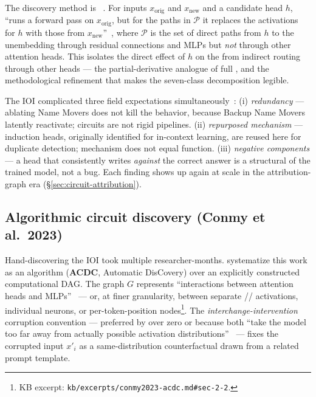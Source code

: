 The discovery method is \emph{}~\citep[\S 3.1]{wang2022-ioi}.
For inputs $x_{\text{orig}}$ and $x_{\text{new}}$ and a candidate head
$h$,  ``runs a forward pass on $x_{\text{orig}}$, but for
the paths in $\mathcal{P}$ it replaces the activations for $h$ with
those from $x_{\text{new}}$''~\citep[\S 3.1]{wang2022-ioi}, where
$\mathcal{P}$ is the set of direct paths from $h$ to the unembedding
through residual connections and MLPs but \emph{not} through other
attention heads. This isolates the direct effect of $h$ on the 
from indirect routing through other heads --- the partial-derivative
analogue of full , and the methodological refinement
that makes the seven-class decomposition legible.

The IOI  complicated three field expectations
simultaneously~\citep[\S 3]{wang2022-ioi}:
(i) \emph{redundancy} --- ablating Name Movers does not kill the
behavior, because Backup Name Movers latently reactivate; circuits are
not rigid pipelines.
(ii) \emph{repurposed mechanism} --- induction heads, originally
identified for in-context learning, are reused here for duplicate
detection; mechanism does not equal function.
(iii) \emph{negative components} --- a head that consistently writes
\emph{against} the correct answer is a structural  of the
trained model, not a bug. Each finding shows up again at scale in the
attribution-graph era (\S\ref{sec:circuit-attribution}).

\subsection{Algorithmic circuit discovery (Conmy et al.\ 2023)}
\label{sec:circuit-acdc}

Hand-discovering the IOI  took multiple researcher-months.
\citet{conmy2023-acdc} systematize this work as an algorithm
(\textbf{ACDC}, Automatic  DisCovery) over an explicitly
constructed computational DAG. The graph $G$ represents ``interactions
between attention heads and MLPs''~\citep[\S 2.2]{conmy2023-acdc} ---
or, at finer granularity, between separate // activations,
individual neurons, or per-token-position
nodes\footnote{KB excerpt:
\texttt{kb/excerpts/conmy2023-acdc.md\#sec-2-2}.}. The
\emph{interchange-intervention} corruption convention --- preferred by
\citet{conmy2023-acdc} over zero or  because both ``take
the model too far away from actually possible activation
distributions''~\citep[\S 2.3]{conmy2023-acdc} --- fixes the corrupted
input $x'_i$ as a same-distribution counterfactual drawn from a
related prompt template.

